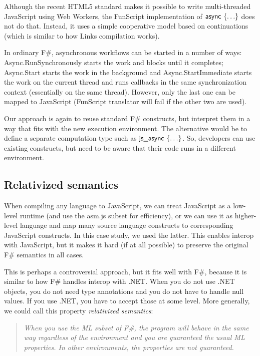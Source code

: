\documentclass[submission,copyright,creativecommons]{eptcs}
\newcommand{\kvd}[1]{\textnormal{\textcolor{kvdclr}{\sffamily #1}}}
\newcommand{\ident}[1]{\textnormal{\sffamily #1}}
\begin{document}
Although the recent HTML5 standard makes it possible to write multi-threaded JavaScript using
Web Workers, the FunScript implementation of $\ident{async}~\{ \ldots \}$ does not do that.
Instead, it uses a simple cooperative model based on continuations (which is similar to how Links
\cite{web-links} compilation works).

In ordinary F\#, asynchronous workflows can be started in a number of ways: \ident{Async.RunSynchronously}
starts the work and blocks until it completes; \ident{Async.Start} starts the work in the background
and \ident{Async.\-Start\-Immediate} starts the work on the current thread and runs callbacks
in the same synchronization context (essentially on the same thread). However, only the last one
can be mapped to JavaScript (FunScript translator will fail if the other two are used).

Our approach is again to reuse standard F\# constructs, but interpret them in a way that fits
with the new execution environment. The alternative would be to define a separate computation type
such as $\ident{js\_async}~\{ \ldots \}$. So, developers can use existing constructs, but need
to be aware that their code runs in a different environment.

\subsection{Relativized semantics}
\label{sec:js-relative}

When compiling any language to JavaScript, we can treat JavaScript as a low-level runtime
(and use the asm.js \cite{asm-js} subset for efficiency), or we can use it as
higher-level language and map many source language constructs to corresponding JavaScript
constructs. In this case study, we used the latter. This enables interop with JavaScript, but
it makes it hard (if at all possible) to preserve the original F\# semantics in all cases.

This is perhaps a controversial approach, but it fits well with F\#, because it is similar to
how F\# handles interop with .NET. When you do not use .NET objects, you do not need type
annotations and you do not have to handle \kvd{null} values. If you use .NET, you have to
accept those at some level. More generally, we could call this property \emph{relativized
semantics}:

\begin{quotation}
\noindent
\emph{When you use the ML subset of F\#, the program will behave in the same way regardless
of the environment and you are guaranteed the usual ML properties. In other environments,
the properties are not guaranteed.}
\end{quotation}
\end{document}

